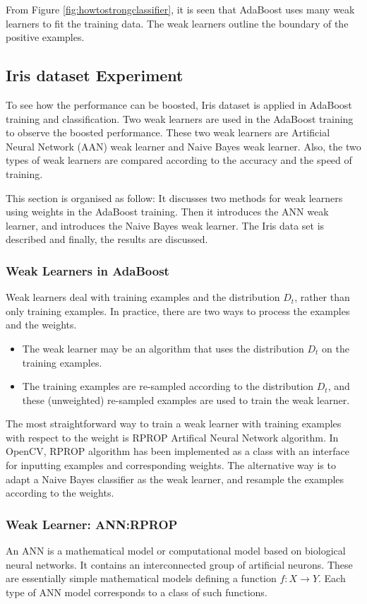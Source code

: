 From \mbox{Figure} \ref{fig:howtostrongclassifier}, it is seen that AdaBoost uses many weak learners to fit the training data. The weak learners outline the boundary of the positive examples. 

\subsection{Iris dataset Experiment}
\label{sec:irisexp}
To see how the performance can be boosted, Iris dataset is applied in AdaBoost training and classification. Two weak learners are used in the AdaBoost training to observe the boosted performance. These two weak learners are Artificial Neural Network (AAN) weak learner and Naive Bayes weak learner. Also, the two types of weak learners are compared according to the accuracy and the speed of training.

This section is organised as follow: It discusses two methods for weak learners using weights in the AdaBoost training. Then it introduces the ANN weak learner, and introduces the Naive Bayes weak learner. The Iris data set is described and finally, the results are discussed.
\subsubsection{Weak Learners in AdaBoost}
\label{adaboost:weaklearner}
Weak learners deal with training examples and the distribution $D_t$, rather than only training examples. In practice, there are two ways to process the examples and the weights.
\begin{itemize}
 \item The weak learner may be an algorithm that uses the distribution $D_{t}$ on the training examples.
 \item The training examples are re-sampled according to the distribution $D_{t}$, and these (unweighted) re-sampled examples are used to train the weak learner.
\end{itemize}
The most straightforward way to train a weak learner with training examples with respect to the weight is RPROP\cite{Riedmiller1993} Artifical Neural Network algorithm. In OpenCV, RPROP algorithm has been implemented as a class with an interface for inputting examples and corresponding weights. The alternative way is to adapt a Naive Bayes classifier as the weak learner, and resample the examples according to the weights.
\subsubsection{Weak Learner: ANN:RPROP}
\label{sec:ann}
An ANN is a mathematical model or computational model based on biological neural networks. It contains an interconnected group of artificial neurons. These are essentially simple mathematical models defining a function $f : X \rightarrow Y$. Each type of ANN model corresponds to a class of such functions.

